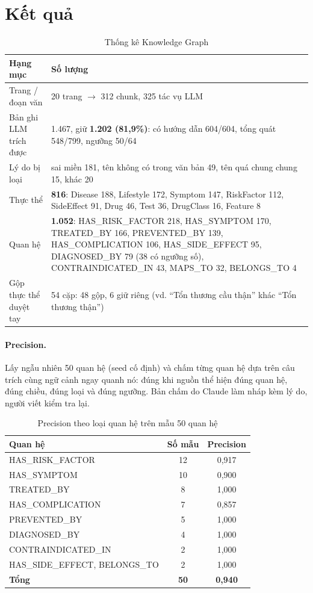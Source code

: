 \documentclass[12pt,a4paper]{report}
\begin{document}
\section{Kết quả}
\begin{table}[H]
\centering
\caption{Thống kê Knowledge Graph}
\label{tab:kg}
\begin{tabularx}{\textwidth}{p{4.3cm}X}
\toprule
\textbf{Hạng mục} & \textbf{Số lượng} \\
\midrule
Trang / đoạn văn & 20 trang $\rightarrow$ 312 chunk, 325 tác vụ LLM \\
Bản ghi LLM trích được & 1.467, giữ \textbf{1.202 (81,9\%)}: có hướng dẫn 604/604, tổng quát 548/799, ngưỡng 50/64 \\
Lý do bị loại & sai miền 181, tên không có trong văn bản 49, tên quá chung chung 15, khác 20 \\
Thực thể & \textbf{816}: Disease 188, Lifestyle 172, Symptom 147, RiskFactor 112, SideEffect 91, Drug 46, Test 36, DrugClass 16, Feature 8 \\
Quan hệ & \textbf{1.052}: HAS\_RISK\_FACTOR 218, HAS\_SYMPTOM 170, TREATED\_BY 166, PREVENTED\_BY 139, HAS\_COMPLICATION 106, HAS\_SIDE\_EFFECT 95, DIAGNOSED\_BY 79 (38 có ngưỡng số), CONTRAINDICATED\_IN 43, MAPS\_TO 32, BELONGS\_TO 4 \\
Gộp thực thể duyệt tay & 54 cặp: 48 gộp, 6 giữ riêng (vd. ``Tổn thương cầu thận'' khác ``Tổn thương thận'') \\
\bottomrule
\end{tabularx}
\end{table}

\paragraph{Precision.} Lấy ngẫu nhiên 50 quan hệ (seed cố định) và chấm từng quan hệ dựa trên câu
trích cùng ngữ cảnh ngay quanh nó: đúng khi nguồn thể hiện đúng quan hệ, đúng chiều, đúng loại
và đúng ngưỡng. Bản chấm do Claude làm nháp kèm lý do, người viết kiểm tra lại.

\begin{table}[H]
\centering
\caption{Precision theo loại quan hệ trên mẫu 50 quan hệ}
\label{tab:precision}
\begin{tabular}{lcc}
\toprule
\textbf{Quan hệ} & \textbf{Số mẫu} & \textbf{Precision} \\
\midrule
HAS\_RISK\_FACTOR & 12 & 0,917 \\
HAS\_SYMPTOM & 10 & 0,900 \\
TREATED\_BY & 8 & 1,000 \\
HAS\_COMPLICATION & 7 & 0,857 \\
PREVENTED\_BY & 5 & 1,000 \\
DIAGNOSED\_BY & 4 & 1,000 \\
CONTRAINDICATED\_IN & 2 & 1,000 \\
HAS\_SIDE\_EFFECT, BELONGS\_TO & 2 & 1,000 \\
\midrule
\textbf{Tổng} & \textbf{50} & \textbf{0,940} \\
\bottomrule
\end{tabular}
\end{table}
\end{document}
